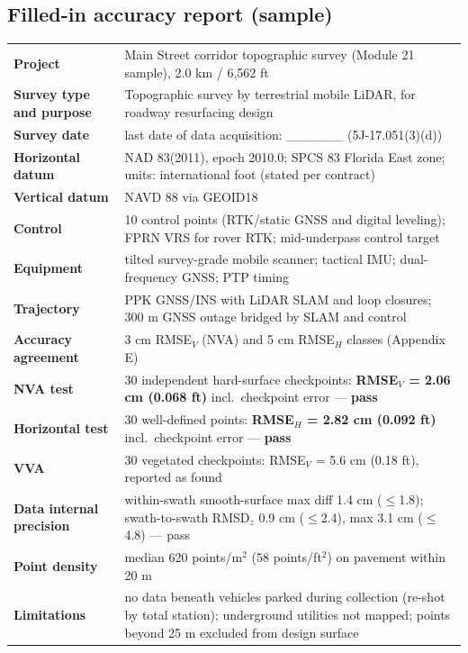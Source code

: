 \subsection*{Filled-in accuracy report (sample)}
\begin{tcolorbox}[base,colback=white,colframe=navy,title={SURVEY AND MAP REPORT --- ACCURACY SECTION (sample, simulated data)}]
\small
\renewcommand{\arraystretch}{1.25}
\begin{tabularx}{\linewidth}{>{\bfseries}p{4.3cm}X}
Project & Main Street corridor topographic survey (Module 21 sample), 2.0 km / 6,562 ft\\
Survey type and purpose & Topographic survey by terrestrial mobile LiDAR, for roadway resurfacing design\\
Survey date & last date of data acquisition: \_\_\_\_\_\_ (5J-17.051(3)(d))\\
Horizontal datum & NAD 83(2011), epoch 2010.0; SPCS 83 Florida East zone; units: international foot (stated per contract)\\
Vertical datum & NAVD 88 via GEOID18\\
Control & 10 control points (RTK/static GNSS and digital leveling); FPRN VRS for rover RTK; mid-underpass control target\\
Equipment & tilted survey-grade mobile scanner; tactical IMU; dual-frequency GNSS; PTP timing\\
Trajectory & PPK GNSS/INS with LiDAR SLAM and loop closures; 300 m GNSS outage bridged by SLAM and control\\
Accuracy agreement & 3 cm RMSE$_V$ (NVA) and 5 cm RMSE$_H$ classes (Appendix E)\\
NVA test & 30 independent hard-surface checkpoints: \textbf{RMSE$_V$ = 2.06 cm (0.068 ft)} incl.\ checkpoint error --- \textbf{pass}\\
Horizontal test & 30 well-defined points: \textbf{RMSE$_H$ = 2.82 cm (0.092 ft)} incl.\ checkpoint error --- \textbf{pass}\\
VVA & 30 vegetated checkpoints: RMSE$_V$ = 5.6 cm (0.18 ft), reported as found\\
Data internal precision & within-swath smooth-surface max diff 1.4 cm ($\le$1.8); swath-to-swath RMSD$_z$ 0.9 cm ($\le$2.4), max 3.1 cm ($\le$4.8) --- pass\\
Point density & median 620 points/m$^2$ (58 points/ft$^2$) on pavement within 20 m\\
Limitations & no data beneath vehicles parked during collection (re-shot by total station); underground utilities not mapped; points beyond 25 m excluded from design surface\\

\end{tabularx}
\end{tcolorbox}
